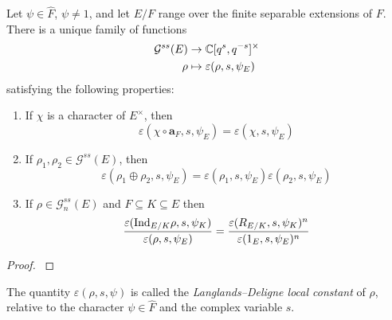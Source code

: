 \begin{thm}
	Let $\psi\in \widehat{F}$, $\psi\not=1$, and let $E/F$ range over the finite separable extensions of $F$. There is a unique family of functions
	\begin{align*}
		\mathcal{G}^{ss}(E)&\to \mathbb{C}[q^s, q^{-s}]^\times\\
		\rho &\mapsto \varepsilon(\rho, s, \psi_E)
	\end{align*}
	satisfying the following properties:
	\begin{enumerate}
		\item If $\chi$ is a character of $E^\times$, then
		\[\varepsilon(\chi\circ \mathbf{a}_F, s, \psi_E) = \varepsilon(\chi, s, \psi_E)\]
		\item If $\rho_1, \rho_2\in \mathcal{G}^{ss}(E)$, then
		\[\varepsilon(\rho_1\oplus \rho_2, s, \psi_E) = \varepsilon(\rho_1, s, \psi_E)\varepsilon(\rho_2, s, \psi_E)\] 
		\item If $\rho \in \mathcal{G}^{ss}_n(E)$ and $F\subseteq K\subseteq E$ then
		\[\frac{\varepsilon(\mathrm{Ind}_{E/K}\rho, s, \psi_K)}{\varepsilon(\rho, s, \psi_E)} = \frac{\varepsilon(R_{E/K}, s, \psi_K)^n}{\varepsilon(1_E, s, \psi_E)^n}\]
	\end{enumerate}
\end{thm}
\begin{proof}
	\cite[Theorem 29.4]{BH1}
\end{proof}
The quantity $\varepsilon(\rho, s, \psi)$ is called the \emph{Langlands--Deligne local constant} of $\rho$, relative to the character $\psi\in \widehat{F}$ and the complex variable $s$.




